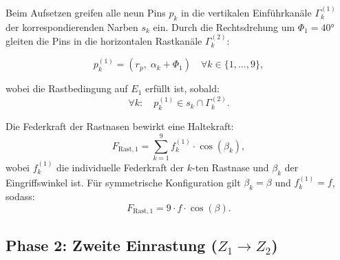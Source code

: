 ﻿\documentclass[12pt, a4paper]{article}
\theoremstyle{remark}
\begin{document}
Beim Aufsetzen greifen alle neun Pins $p_k$ in die vertikalen Einführkanäle $\Gamma_k^{(1)}$ der
korrespondierenden Narben $s_k$ ein. Durch die Rechtsdrehung um $\Phi_1 = 40 °$ gleiten die Pins
in die horizontalen Rastkanäle $\Gamma_k^{(2)}$:

\begin{equation}
  p_k^{(1)} = \left(r_p,\; \alpha_k + \Phi_1\right) \quad \forall k \in \{1,\ldots,9\},
\end{equation}

wobei die Rastbedingung auf $E_1$ erfüllt ist, sobald:
\begin{equation}
  \label{eq:rastbedingung1}
  \forall k: \quad p_k^{(1)} \in s_k \cap \Gamma_k^{(2)}.
\end{equation}

Die Federkraft der Rastnasen bewirkt eine Haltekraft:
\begin{equation}
  F_{\text{Rast},1} = \sum_{k=1}^{9} f_k^{(1)} \cdot \cos(\beta_k),
\end{equation}
wobei $f_k^{(1)}$ die individuelle Federkraft der $k$-ten Rastnase und $\beta_k$ der
Eingriffswinkel ist. Für symmetrische Konfiguration gilt $\beta_k = \beta$ und $f_k^{(1)} = f$, sodass:
\begin{equation}
  F_{\text{Rast},1} = 9 \cdot f \cdot \cos(\beta).
\end{equation}

\subsection{Phase 2: Zweite Einrastung ($Z_1 \to Z_2$)}
\end{document}
